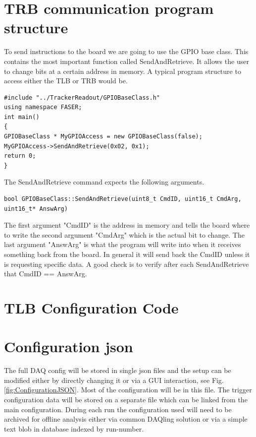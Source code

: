 \section{TRB communication program structure}

To send instructions to the board we are going to use the GPIO base class. This contains the most important function called SendAndRetrieve. It allows the user to change bits at a certain address in memory. A typical program structure to access either the TLB or TRB would be. 

\begin{lstlisting}[caption={In this example, SendAndRetrieve has two parameters: 0x02 and 0x1. 0x02 corresponds to the address in memory and 0x01 corresponds to the payload.},captionpos=b]
#include "../TrackerReadout/GPIOBaseClass.h"
using namespace FASER;
int main() 
{
GPIOBaseClass * MyGPIOAccess = new GPIOBaseClass(false);
MyGPIOAccess->SendAndRetrieve(0x02, 0x1);
return 0;
}
\end{lstlisting}

The SendAndRetrieve command expects the following arguments. \begin{lstlisting}
bool GPIOBaseClass::SendAndRetrieve(uint8_t CmdID, uint16_t CmdArg, uint16_t* AnswArg)
\end{lstlisting}
The first argument "CmdID" is the address in memory and tells the board where to write the second argument "CmdArg" which is the actual bit to change. The last argument "AnswArg" is what the program will write into when it receives something back from the board. In general it will send back the CmdID unless it is requesting specific data. A good check is to verify after each SendAndRetrieve that CmdID == AnswArg.

\section{TLB Configuration Code}



\section{Configuration json}
\label{configuration}

The full DAQ config will be stored in single json files and the setup can be modified either by directly changing it or via a GUI interaction, see Fig.\ref{fig:ConfigurationJSON}. Most of the configuration will be in this file. The trigger configuration data will be stored on a separate file which can be linked from the main configuration. During each run the configuration used will need to be archived for offline analysis either via common DAQling solution or via a simple text blob in database indexed by run-number.

